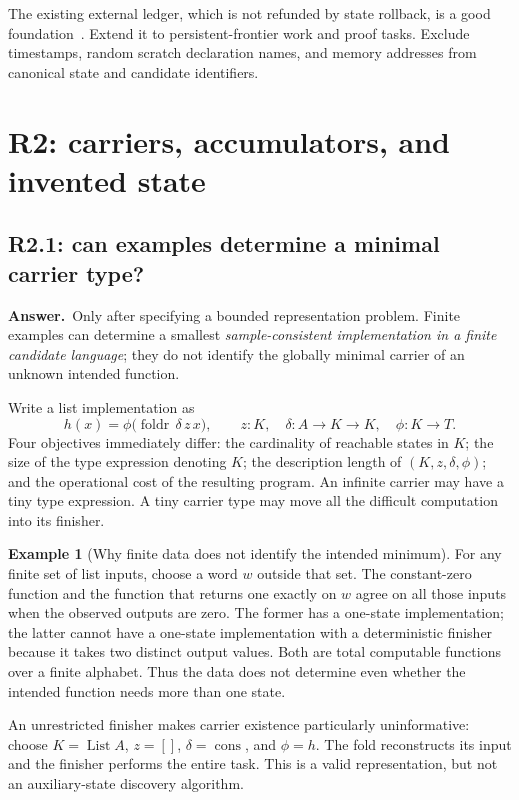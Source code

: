 \documentclass[11pt,a4paper]{article}
\theoremstyle{definition}
\newtheorem{example}[proposition]{Example}
\theoremstyle{remark}
\newcommand{\List}{\operatorname{List}}
\newcommand{\foldr}{\operatorname{foldr}}
\newcommand{\ans}{\noindent\textbf{Answer.}\ }
\begin{document}
The existing external ledger, which is not refunded by state rollback, is a
good foundation~\cite{implementation}. Extend it to persistent-frontier work
and proof tasks. Exclude timestamps, random scratch declaration names, and
memory addresses from canonical state and candidate identifiers.

\section{R2: carriers, accumulators, and invented state}\label{sec:r2}

\subsection{R2.1: can examples determine a minimal carrier type?}\label{q:R2.1}
\ans Only after specifying a bounded representation problem. Finite examples
can determine a smallest \emph{sample-consistent implementation in a finite
candidate language}; they do not identify the globally minimal carrier of an
unknown intended function.

Write a list implementation as
\begin{equation}\label{eq:carrier}
 h(x)=\phi\bigl(\foldr\,\delta\,z\,x\bigr),\qquad
 z:K,\quad\delta:A\to K\to K,\quad\phi:K\to T.
\end{equation}
Four objectives immediately differ: the cardinality of reachable states in
$K$; the size of the type expression denoting $K$; the description length of
$(K,z,\delta,\phi)$; and the operational cost of the resulting program. An
infinite carrier may have a tiny type expression. A tiny carrier type may move
all the difficult computation into its finisher.

\begin{example}[Why finite data does not identify the intended minimum]
For any finite set of list inputs, choose a word $w$ outside that set. The
constant-zero function and the function that returns one exactly on $w$ agree
on all those inputs when the observed outputs are zero. The former has a
one-state implementation; the latter cannot have a one-state implementation
with a deterministic finisher because it takes two distinct output values.
Both are total computable functions over a finite alphabet. Thus the data does
not determine even whether the intended function needs more than one state.
\end{example}

An unrestricted finisher makes carrier existence particularly uninformative:
choose $K=\List A$, $z=[]$, $\delta=\operatorname{cons}$, and $\phi=h$. The fold
reconstructs its input and the finisher performs the entire task. This is a
valid representation, but not an auxiliary-state discovery algorithm.
\end{document}

